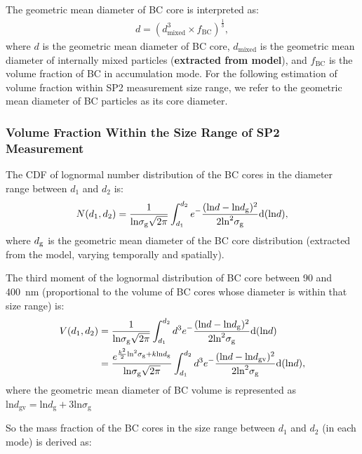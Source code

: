 \documentclass[12pt]{article}
\begin{document}
	
	The geometric mean diameter of BC core is interpreted as:
	\begin{align*}
	d = (d_{\text{mixed}}^3 \times f_{\text{BC}})^\frac{1}{3}, 
	\end{align*}
	where $d$ is the geometric mean diameter of BC core,
	$d_{\text{mixed}}$ is the geometric mean diameter of internally mixed particles
	(\textbf{extracted from model}), and $f_{\text{BC}}$ is the volume
	fraction of BC in accumulation mode. For the following estimation of volume fraction within SP2 measurement size range, we refer to the geometric mean diameter of BC particles as its core diameter.
	
	\subsubsection{Volume Fraction Within the Size Range of SP2 Measurement}
	The CDF of lognormal number distribution of the BC cores in the diameter range between $d_{1}$ and
	$d_{2}$ is:
	\begin{align*}
	N(d_{1}, d_{2}) = \frac{1}{\text{ln}\sigma_{\text{g}}\sqrt{2\pi}}\int_{d_{1}}^{d_{2}}e^-\frac{(\text{ln}d - \text{ln}d_{\rm g})^2}{2\text{ln}^2\sigma_{\text{g}}}\text{d}(\text{ln}d),
	\end{align*}
	where $d_{\rm g}$ is the geometric mean diameter of the BC core distribution (extracted from the model, varying temporally and spatially). 
	
	The third moment of the lognormal distribution of BC core between 90 and 400~nm (proportional to the volume of BC cores whose diameter is within that size range) is:
	\begin{align*}
	V(d_{1}, d_{2}) &= \frac{1}{\text{ln}\sigma_{\text{g}}\sqrt{2\pi}}\int_{d_{1}}^{d_{2}}d^3e^-\frac{(\text{ln}d - \text{ln}d_{\rm g})^2}{2\text{ln}^2\sigma_{\text{g}}}\text{d}(\text{ln}d)  \\
	&=\frac{e^{\frac{k^2}{2}\text{ln}^2\sigma_{\rm g}+k\text{ln}d_{\rm g}}}{\text{ln}\sigma_{\text{g}}\sqrt{2\pi}}\int_{d_{1}}^{d_{2}}d^3e^-\frac{(\text{ln}d - \text{ln}d_{\text{gv}})^2}{2\text{ln}^2\sigma_{\text{g}}}\text{d}(\text{ln}d),
	\end{align*}
	where the geometric mean diameter of BC volume is represented as $\text{ln}d_{\text{gv}}
	= \text{ln}d_{\text{g}} + 3\text{ln}\sigma_{\text{g}}$
	
	So the mass fraction of the BC cores in the size range between $d_{1}$ and $d_{2}$ (in each mode) is derived as:
	
\end{document}
